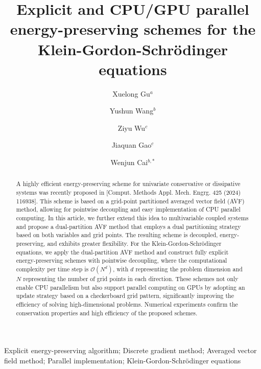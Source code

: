 \documentclass[fleqn,11pt]{elsarticle}
\numberwithin{equation}{section}
\begin{document}
\begin{frontmatter}


	\title{Explicit and CPU/GPU parallel energy-preserving schemes for the Klein-Gordon-Schr\"odinger equations}
	\author{Xuelong Gu$^{a}$}
	\author{Yushun Wang$^{b}$}
	\author{Ziyu Wu$^{c}$}
	\author{Jiaquan Gao$^{c}$}
	\author{Wenjun Cai$^{b,*}$}

	\address[1]{Department of Mathematics, University of South Carolina, Columbia, SC, 29208, USA\\ \vspace{0cm}}

	\address[2]{Ministry of Education Key Laboratory for NSLSC\\ School of Mathematical Sciences,
		Nanjing Normal University, Nanjing, 210023, China  \\ \vspace{0cm} }
		
		
	\address[3]{School of Computer and Electronic Information, Nanjing Normal University, Nanjing, 210023, China  \\ \vspace{0cm} }
		

		

	\begin{abstract}


		A highly efficient energy-preserving scheme for univariate conservative or dissipative systems was recently proposed in [Comput. Methods Appl. Mech. Engrg. 425 (2024) 116938]. This scheme is based on a grid-point partitioned averaged vector field (AVF) method, allowing for pointwise decoupling and easy implementation of CPU parallel computing. In this article, we further extend this idea to multivariable coupled systems and propose a dual-partition AVF method that employs a dual partitioning strategy based on both variables and grid points. The resulting scheme is decoupled, energy-preserving, and exhibits greater flexibility. For the Klein-Gordon-Schr\"odinger equations, we apply the dual-partition AVF method and construct fully explicit energy-preserving schemes with pointwise decoupling, where the computational complexity per time step is $\mathcal{O}(N^d)$, with $d$ representing the problem dimension and $N$ representing the number of grid points in each direction. These schemes not only enable CPU parallelism but also support parallel computing on GPUs by adopting an update strategy based on a checkerboard grid pattern, significantly improving the efficiency of solving high-dimensional problems. Numerical experiments confirm the conservation properties and high efficiency of the proposed schemes.


	\end{abstract}

	\begin{keyword}
		Explicit energy-preserving algorithm;
		Discrete gradient method;
		Averaged vector field method;
		Parallel implementation;
		Klein-Gordon-Schr\"odinger equations
	\end{keyword}

\end{frontmatter}
\end{document}
